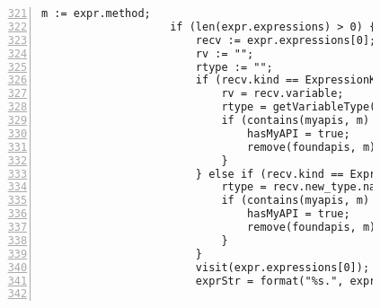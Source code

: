 \begin{figure}[ht!]
\begin{lstlisting}[numbers=left, tabsize=4, escapechar=@, caption={API Usage Mining Analysis},label={lst:aun-code},  firstline = 321, firstnumber = 321, lastline = 381]
                    m := expr.method;
                    if (len(expr.expressions) > 0) {
                        recv := expr.expressions[0];  
                        rv := ""; 
                        rtype := "";
                        if (recv.kind == ExpressionKind.VARACCESS) {
                            rv = recv.variable;
                            rtype = getVariableType(rv, true);
                            if (contains(myapis, m) && rtype != "") {
                                hasMyAPI = true;
                                remove(foundapis, m);
                            }
                        } else if (recv.kind == ExpressionKind.NEW) {
                            rtype = recv.new_type.name;
                            if (contains(myapis, m) && isAPIConstructor(recv.new_type.name)) {
                                hasMyAPI = true;    
                                remove(foundapis, m);
                            }
                        }
                        visit(expr.expressions[0]);
                        exprStr = format("%s.", exprStr);
                        

\end{lstlisting}
\end{figure}
